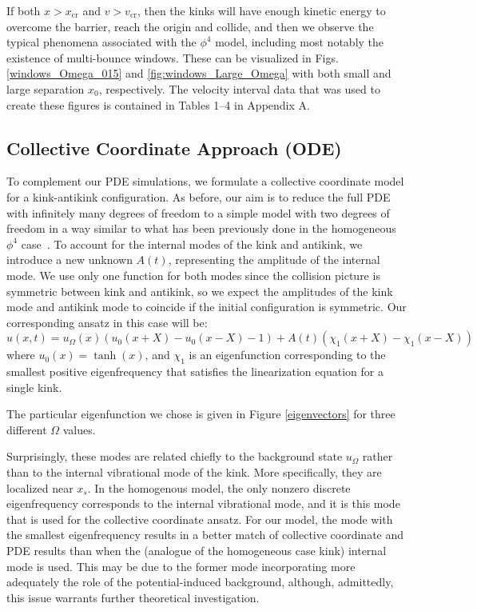 \documentclass[vecphys]{svmult}		%
\begin{document}
If both $x>x_\mathrm{cr}$ and $v > v_\mathrm{cr}$, then the kinks will have
enough kinetic energy to overcome the barrier, reach the origin and collide,
and then we observe the typical phenomena associated with the
$\phi^4$ model, including most notably the existence of multi-bounce windows.
These can be visualized in Figs. \ref{windows_Omega_015} and \ref{fig:windows_Large_Omega} with both small and large separation $x_0$, respectively. The velocity interval data that was used to create these figures is contained in Tables 1--4 in Appendix A.
 











\subsection{Collective Coordinate Approach (ODE)}

 To complement our PDE simulations, we formulate a collective coordinate model for a kink-antikink configuration. As before, our aim is to reduce the full PDE with infinitely many degrees of freedom to a simple model with two degrees of freedom in a way similar to what has been previously done
 in the homogeneous $\phi^4$ case~\cite{campbell,anninos,goodman2,goodman}. 
To account for the internal modes of the kink and antikink, we introduce a new unknown $A(t)$, representing the amplitude of the internal mode. We use only one function for both modes since the collision picture is symmetric between kink and antikink, so we expect the amplitudes of the kink mode and antikink mode to
coincide if the initial configuration is symmetric. 
Our corresponding ansatz in this case will be:
\begin{equation}\label{ansatz}
u(x,t)=u_{\Omega}(x)(u_0(x+X)-u_{0}(x-X)-1)+A(t)(\chi_1(x+X)-\chi_1(x-X)) 
\end{equation}
where $u_{0}(x)=\tanh(x)$, and $\chi_1$ is an eigenfunction corresponding to the smallest positive eigenfrequency that satisfies the linearization equation for a single kink.


The particular eigenfunction we chose is given in Figure \ref{eigenvectors} for three different $\Omega$ values.

 Surprisingly, these modes are related
 chiefly to the background state $u_{\Omega}$ rather than to the internal vibrational mode of the kink.
 More specifically, they are localized near $x_s$.
 In the homogenous model, the only nonzero discrete eigenfrequency corresponds to the internal vibrational mode, and it is this mode that is used for the collective coordinate ansatz. For our model, the mode with the smallest eigenfrequency results in a better match of collective coordinate and PDE results than when the (analogue of the homogeneous case kink) internal
  mode is used. This may be due to the former mode incorporating more
  adequately the role of the potential-induced background, although,
  admittedly, this issue warrants further theoretical investigation.
\end{document}
